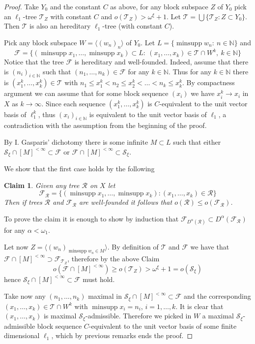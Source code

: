 \documentclass[a4paper]{amsart}
\theoremstyle{plain}
\newtheorem*{claim}{Claim}
\newcommand{\N}{\mathbb{N}}
\newcommand{\mc}{\mathcal}
\DeclareMathOperator{\minsupp}{minsupp}
\begin{document}
\begin{proof}
Take $Y_0$ and the constant $C$ as above, for any block subspace
$Z$ of $Y_0$ pick an $\ell_{1}$-tree $\mc{T}_Z$ with constant $C$
and $o(\mc{T}_Z)>\omega^\xi+1$. Let $\mc{T}=\bigcup \{\mc{T}_Z:
Z\subset Y_0\}$. Then $\mc{T}$ is also an hereditary $\ell_{1}$-tree
(with constant $C$).

Pick any block subspace $W=\langle (w_n)_n\rangle$ of $Y_0$. Let $L=\{\minsupp w_n:\
n\in\N\}$ and
$$
\mc{F}=\{(\minsupp x_1,\dots,\minsupp x_k)\subset L: \ (x_1,\dots,x_k)\in
\mc{T}\cap W^k,\ k\in\N\}
$$
Notice that the tree $\mc{F}$ is hereditary and well-founded.
Indeed, assume that there is $(n_i)_{i\in\N}$ such that
$(n_1,\dots,n_k)\in \mc{F}$ for any $k\in\N$. Thus for any
$k\in\N$ there is $(x_1^k,\dots,x_k^k)\in \mc{T}$ with $n_1\leq
x_1^k<n_2\leq x_2^k<\dots<n_k\leq x_k^k$. By compactness argument
we can assume that for some block sequence $(x_i)$ we have
$x_i^k\to x_i$ in $X$ as $k\to\infty$. Since each sequence
$(x_1^k,\dots,x_k^k)$ is $C$-equivalent to the unit vector basis
of $\ell_{1}^k$, thus $(x_i)_{i\in\N}$ is equivalent to the unit
vector basis of $\ell_{1}$, a contradiction with the assumption from
the beginning of the proof.

By I. Gasparis' dichotomy \cite{GA} there is some infinite
$M\subset L$ such that either $\mc{S}_\xi\cap [M]^{<\infty}\subset
\mc{F}$ or $\mc{F}\cap [M]^{<\infty}\subset \mc{S}_\xi$.

We show that the first case holds by the following
\begin{claim}
Given any tree $\mc{R}$ on $X$ let
$$
\mc{F}_\mc{R}=\{(\minsupp x_1,\dots,\minsupp x_k): (x_1,\dots,x_k)\in
\mc{R}\}
$$
Then if trees $\mc{R}$ and $\mc{F}_\mc{R}$ are well-founded it
follows that $o(\mc{R})\leq o(\mc{F}_\mc{R})$.
\end{claim}
To prove the claim it is enough to show by induction that
$\mc{F}_{D^\alpha (\mc{R})}\subset D^\alpha (\mc{F}_\mc{R}) $ for
any $\alpha<\omega_1$.

Let now $Z=\langle (w_n)_{\minsupp w_n\in M}\rangle$. By definition of $\mc{T}$ and
$\mc{F}$ we have that $\mc{F}\cap [M]^{<\infty}\supset
\mc{F}_{\mc{T}_Z}$, therefore by the above Claim
$$
o(\mc{F}\cap [M]^{<\infty})\geq
o(\mc{T}_Z)>\omega^\xi+1=o(\mc{S}_\xi)
$$
hence $\mc{S}_\xi\cap [M]^{<\infty}\subset \mc {F}$ must hold.

Take now any $(n_1,\dots,n_k)$ maximal in $\mc{S}_\xi\cap
[M]^{<\infty}\subset \mc{F}$ and the corresponding
$(x_1,\dots,x_k)\in \mc{T}\cap W^k$ with $\minsupp x_i=n_i$,
$i=1,\dots,k$. It is clear that $(x_1,\dots, x_k)$ is
maximal $\mc{S}_\xi$-admissible. Therefore we picked in $W$
a maximal $\mc{S}_\xi$-admissible block sequence
$C$-equivalent to the unit vector basis of some finite dimensional
$\ell_{1}$, which by previous remarks ends the proof.
\end{proof}
\end{document}
